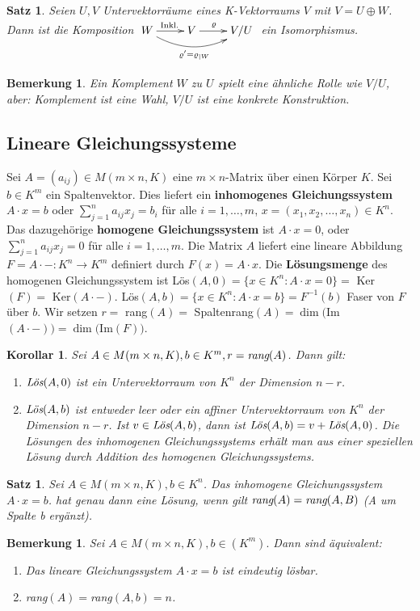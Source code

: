 \documentclass[12pt,a4paper]{article}
\theoremstyle{plain}
\newtheorem{Satz}[Theorem]{Satz}
\newtheorem{Korollar}[Theorem]{Korollar}
\newtheorem{Bemerkung}[Theorem]{Bemerkung}
\numberwithin{equation}{section}
\begin{document}
\begin{Satz}
Seien $U,V$ Untervektorräume eines K-Vektorraums $V$ mit $V=U\oplus W$. Dann ist die Komposition $ \begin{xy}
\xymatrix{
	W \ar[r]^{\text{Inkl.}} \ar@/_ 0.5cm/[rr]_{\varrho'=\varrho_{|W}} & V \ar[r]^/-0.25em/\varrho & V/U
}
\end{xy} $ ein Isomorphismus.
\end{Satz}
\begin{Bemerkung}
Ein Komplement $W$ zu $U$ spielt eine ähnliche Rolle wie $V/U$, aber: Komplement ist eine Wahl, $V/U$ ist eine konkrete Konstruktion.
\end{Bemerkung}
\subsection{Lineare Gleichungssysteme}
Sei $A=(a_{ij})\in M(m\times n,K)$ eine $m\times n$-Matrix über einen Körper $K$. Sei $b\in K^m$ ein Spaltenvektor. Dies liefert ein \textbf{inhomogenes Gleichungssystem} $A\cdot x=b$ oder $\sum_{j=1}^n {a_{ij}x_j}=b_i$ für alle $i=1,\ldots,m$, $x=(x_1,x_2,\ldots,x_n) \in K^n$. Das dazugehörige \textbf{homogene Gleichungssystem} ist $A\cdot x=0$, oder $\sum_{j=1}^n{a_{ij}x_j}=0$ für alle $i=1,\ldots,m$. Die Matrix $A$ liefert eine lineare Abbildung $F=A\cdot -: K^n \rightarrow K^m$ definiert durch $F(x)=A\cdot x$. Die \textbf{Lösungsmenge} des homogenen Gleichungssystem ist Lös$(A,0)=\{x\in K^n:A\cdot x=0\}=$ Ker$(F)=$ Ker$(A\cdot -)$. Lös$(A,b)=\{x\in K^n:A\cdot x=b\}=F^{-1}(b)$ Faser von $F$ über $b$. Wir setzen $r=$ rang$(A)=$ Spaltenrang$(A)=\dim($Im$(A\cdot -))=\dim($Im$(F))$.
\begin{Korollar}
Sei $A\in M(m\times n,K), b\in K^m, r=\emph{rang}(A)$. Dann gilt: \begin{enumerate}
\renewcommand{\labelenumi}{\emph{\arabic{enumi})}}
\item $\emph{Lös}(A,0)$ ist ein Untervektorraum von $K^n$ der Dimension $n-r$.
\item $\emph{Lös}(A,b)$ ist entweder leer oder ein affiner Untervektorraum von $K^n$ der Dimension $n-r$. Ist $v\in \emph{Lös}(A,b)$, dann ist $\emph{Lös}(A,b)=v+\emph{Lös}(A,0)$. \glqq Die Lösungen des inhomogenen Gleichungssystems erhält man aus einer speziellen Lösung durch Addition des homogenen Gleichungssystems\grqq.
\end{enumerate}
\end{Korollar}
\begin{Satz}
Sei $A\in M(m\times n,K), b\in K^n$. Das inhomogene Gleichungssystem $A\cdot x=b$. hat genau dann eine Lösung, wenn gilt $\emph{rang}(A)=\emph{rang}(A,B)$ (A um Spalte b ergänzt).
\end{Satz}
\begin{Bemerkung}
Sei $A\in M(m\times n, K),b\in (K^m).$ Dann sind äquivalent: \begin{enumerate}
\renewcommand{\labelenumi}{(\roman{enumi})}
\item Das lineare Gleichungssystem $A\cdot x=b$ ist eindeutig lösbar.
\item rang$(A)=$rang$(A,b)=n$.
\end{enumerate}
\end{Bemerkung}
\end{document}
